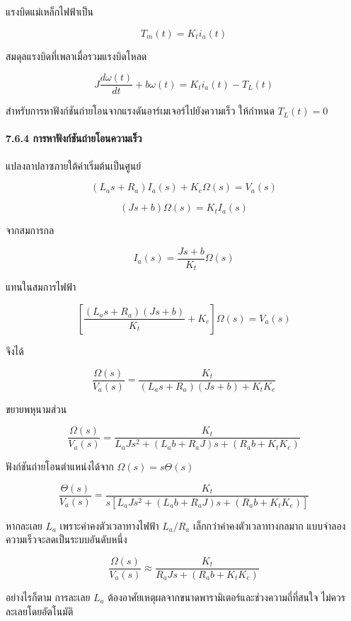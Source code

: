 แรงบิดแม่เหล็กไฟฟ้าเป็น

\[
T_m(t)=K_ti_a(t)
\]

สมดุลแรงบิดที่เพลาเมื่อรวมแรงบิดโหลด

\[
J\frac{d\omega(t)}{dt}+b\omega(t)=K_ti_a(t)-T_L(t)
\]

สำหรับการหาฟังก์ชันถ่ายโอนจากแรงดันอาร์เมเจอร์ไปยังความเร็ว ให้กำหนด $T_L(t)=0$

\paragraph{7.6.4 การหาฟังก์ชันถ่ายโอนความเร็ว}

แปลงลาปลาซภายใต้ค่าเริ่มต้นเป็นศูนย์

\[
(L_as+R_a)I_a(s)+K_e\Omega(s)=V_a(s)
\]

\[
(Js+b)\Omega(s)=K_tI_a(s)
\]

จากสมการกล

\[
I_a(s)=\frac{Js+b}{K_t}\Omega(s)
\]

แทนในสมการไฟฟ้า

\[
\left[
\frac{(L_as+R_a)(Js+b)}{K_t}+K_e
\right]\Omega(s)=V_a(s)
\]

จึงได้

\[
\boxed{
\frac{\Omega(s)}{V_a(s)}
=
\frac{K_t}
{(L_as+R_a)(Js+b)+K_tK_e}
}
\]

ขยายพหุนามส่วน

\[
\boxed{
\frac{\Omega(s)}{V_a(s)}
=
\frac{K_t}
{L_aJs^2+(L_ab+R_aJ)s+(R_ab+K_tK_e)}
}
\]

ฟังก์ชันถ่ายโอนตำแหน่งได้จาก $\Omega(s)=s\Theta(s)$

\[
\boxed{
\frac{\Theta(s)}{V_a(s)}
=
\frac{K_t}
{s\left[L_aJs^2+(L_ab+R_aJ)s+(R_ab+K_tK_e)\right]}
}
\]

หากละเลย $L_a$ เพราะค่าคงตัวเวลาทางไฟฟ้า $L_a/R_a$ เล็กกว่าค่าคงตัวเวลาทางกลมาก แบบจำลองความเร็วจะลดเป็นระบบอันดับหนึ่ง

\[
\frac{\Omega(s)}{V_a(s)}
\approx
\frac{K_t}
{R_aJs+(R_ab+K_tK_e)}
\]

อย่างไรก็ตาม การละเลย $L_a$ ต้องอาศัยเหตุผลจากขนาดพารามิเตอร์และช่วงความถี่ที่สนใจ ไม่ควรละเลยโดยอัตโนมัติ

